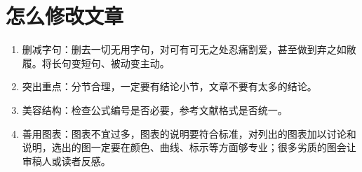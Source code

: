 \documentclass[11pt,final]{article}
\numberwithin{equation}{section}
\begin{document}
\section{怎么修改文章}
\begin{enumerate}
	\item 删减字句：删去一切无用字句，对可有可无之处忍痛割爱，甚至做到弃之如敝履。将长句变短句、被动变主动。
	\item 突出重点：分节合理，一定要有结论小节，文章不要有太多的结论。
	\item 美容结构：检查公式编号是否必要，参考文献格式是否统一。
	\item 善用图表：图表不宜过多，图表的说明要符合标准，对列出的图表加以讨论和说明，选出的图一定要在颜色、曲线、标示等方面够专业；很多劣质的图会让审稿人或读者反感。
\end{enumerate}
\end{document}

